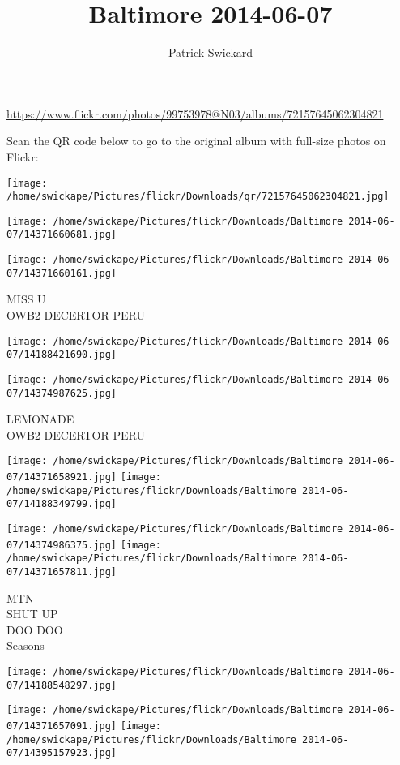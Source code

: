 \documentclass[10pt,letterpaper]{article}
\title{Baltimore 2014-06-07}
\author{Patrick Swickard}
\date{}
\begin{document}
\maketitle

\url{https://www.flickr.com/photos/99753978@N03/albums/72157645062304821}

Scan the QR code below to go to the original album with full-size photos on Flickr:

\texttt{[image: /home/swickape/Pictures/flickr/Downloads/qr/72157645062304821.jpg]}
\pagebreak

\texttt{[image: /home/swickape/Pictures/flickr/Downloads/Baltimore 2014-06-07/14371660681.jpg]}

\vspace{0.25in}
\texttt{[image: /home/swickape/Pictures/flickr/Downloads/Baltimore 2014-06-07/14371660161.jpg]}

MISS U\\
OWB2 DECERTOR PERU
\pagebreak

\texttt{[image: /home/swickape/Pictures/flickr/Downloads/Baltimore 2014-06-07/14188421690.jpg]}

\vspace{0.25in}
\texttt{[image: /home/swickape/Pictures/flickr/Downloads/Baltimore 2014-06-07/14374987625.jpg]}

LEMONADE\\
OWB2 DECERTOR PERU
\pagebreak

\texttt{[image: /home/swickape/Pictures/flickr/Downloads/Baltimore 2014-06-07/14371658921.jpg]}
\texttt{[image: /home/swickape/Pictures/flickr/Downloads/Baltimore 2014-06-07/14188349799.jpg]}

\texttt{[image: /home/swickape/Pictures/flickr/Downloads/Baltimore 2014-06-07/14374986375.jpg]}
\texttt{[image: /home/swickape/Pictures/flickr/Downloads/Baltimore 2014-06-07/14371657811.jpg]}

MTN\\
SHUT UP\\
DOO DOO\\
Seasons
\pagebreak

\texttt{[image: /home/swickape/Pictures/flickr/Downloads/Baltimore 2014-06-07/14188548297.jpg]}

\vspace{0.25in}
\texttt{[image: /home/swickape/Pictures/flickr/Downloads/Baltimore 2014-06-07/14371657091.jpg]}
\texttt{[image: /home/swickape/Pictures/flickr/Downloads/Baltimore 2014-06-07/14395157923.jpg]}
\end{document}
